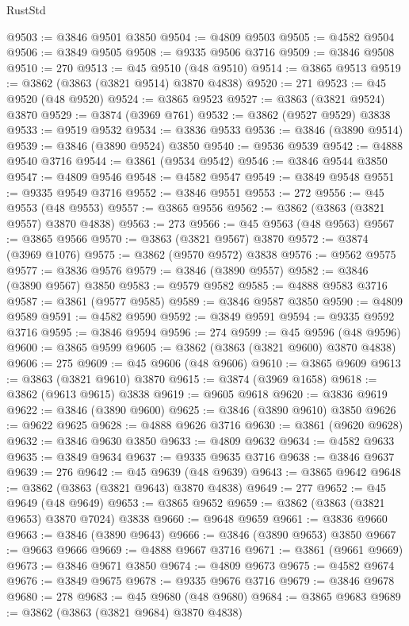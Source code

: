 \begin{lexlean}{RustStd}
\begin{coremodule}
@9503 := @3846 @9501 @3850
@9504 := @4809 @9503
@9505 := @4582 @9504
@9506 := @3849 @9505
@9508 := @9335 @9506 @3716
@9509 := @3846 @9508
@9510 := 270
@9513 := @45 @9510 (@48 @9510)
@9514 := @3865 @9513
@9519 := @3862 (@3863 (@3821 @9514) @3870 @4838)
@9520 := 271
@9523 := @45 @9520 (@48 @9520)
@9524 := @3865 @9523
@9527 := @3863 (@3821 @9524) @3870
@9529 := @3874 (@3969 @761)
@9532 := @3862 (@9527 @9529) @3838
@9533 := @9519 @9532
@9534 := @3836 @9533
@9536 := @3846 (@3890 @9514)
@9539 := @3846 (@3890 @9524) @3850
@9540 := @9536 @9539
@9542 := @4888 @9540 @3716
@9544 := @3861 (@9534 @9542)
@9546 := @3846 @9544 @3850
@9547 := @4809 @9546
@9548 := @4582 @9547
@9549 := @3849 @9548
@9551 := @9335 @9549 @3716
@9552 := @3846 @9551
@9553 := 272
@9556 := @45 @9553 (@48 @9553)
@9557 := @3865 @9556
@9562 := @3862 (@3863 (@3821 @9557) @3870 @4838)
@9563 := 273
@9566 := @45 @9563 (@48 @9563)
@9567 := @3865 @9566
@9570 := @3863 (@3821 @9567) @3870
@9572 := @3874 (@3969 @1076)
@9575 := @3862 (@9570 @9572) @3838
@9576 := @9562 @9575
@9577 := @3836 @9576
@9579 := @3846 (@3890 @9557)
@9582 := @3846 (@3890 @9567) @3850
@9583 := @9579 @9582
@9585 := @4888 @9583 @3716
@9587 := @3861 (@9577 @9585)
@9589 := @3846 @9587 @3850
@9590 := @4809 @9589
@9591 := @4582 @9590
@9592 := @3849 @9591
@9594 := @9335 @9592 @3716
@9595 := @3846 @9594
@9596 := 274
@9599 := @45 @9596 (@48 @9596)
@9600 := @3865 @9599
@9605 := @3862 (@3863 (@3821 @9600) @3870 @4838)
@9606 := 275
@9609 := @45 @9606 (@48 @9606)
@9610 := @3865 @9609
@9613 := @3863 (@3821 @9610) @3870
@9615 := @3874 (@3969 @1658)
@9618 := @3862 (@9613 @9615) @3838
@9619 := @9605 @9618
@9620 := @3836 @9619
@9622 := @3846 (@3890 @9600)
@9625 := @3846 (@3890 @9610) @3850
@9626 := @9622 @9625
@9628 := @4888 @9626 @3716
@9630 := @3861 (@9620 @9628)
@9632 := @3846 @9630 @3850
@9633 := @4809 @9632
@9634 := @4582 @9633
@9635 := @3849 @9634
@9637 := @9335 @9635 @3716
@9638 := @3846 @9637
@9639 := 276
@9642 := @45 @9639 (@48 @9639)
@9643 := @3865 @9642
@9648 := @3862 (@3863 (@3821 @9643) @3870 @4838)
@9649 := 277
@9652 := @45 @9649 (@48 @9649)
@9653 := @3865 @9652
@9659 := @3862 (@3863 (@3821 @9653) @3870 @7024) @3838
@9660 := @9648 @9659
@9661 := @3836 @9660
@9663 := @3846 (@3890 @9643)
@9666 := @3846 (@3890 @9653) @3850
@9667 := @9663 @9666
@9669 := @4888 @9667 @3716
@9671 := @3861 (@9661 @9669)
@9673 := @3846 @9671 @3850
@9674 := @4809 @9673
@9675 := @4582 @9674
@9676 := @3849 @9675
@9678 := @9335 @9676 @3716
@9679 := @3846 @9678
@9680 := 278
@9683 := @45 @9680 (@48 @9680)
@9684 := @3865 @9683
@9689 := @3862 (@3863 (@3821 @9684) @3870 @4838)

\end{coremodule}
\end{lexlean}
